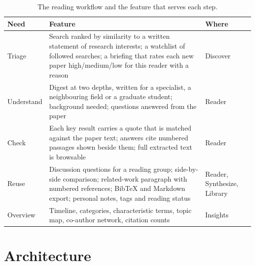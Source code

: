 \documentclass[11pt,a4paper]{article}
\begin{document}
\begin{table}[htbp]\centering\small
\begin{tabularx}{\linewidth}{@{}l>{\raggedright\arraybackslash}X>{\raggedright\arraybackslash}X@{}}
\toprule
Need & Feature & Where \\
\midrule
Triage & Search ranked by similarity to a written statement of research interests; a watchlist of followed
  searches; a briefing that rates each new paper high/medium/low for this reader with a reason &
  Discover \\
Understand & Digest at two depths, written for a specialist, a neighbouring field or a graduate student;
  background needed; questions answered from the paper & Reader \\
Check & Each key result carries a quote that is matched against the paper text; answers cite numbered
  passages shown beside them; full extracted text is browsable & Reader \\
Reuse & Discussion questions for a reading group; side-by-side comparison; related-work paragraph with
  numbered references; BibTeX and Markdown export; personal notes, tags and reading status &
  Reader, Synthesize, Library \\
Overview & Timeline, categories, characteristic terms, topic map, co-author network, citation counts &
  Insights \\
\bottomrule
\end{tabularx}
\caption{The reading workflow and the feature that serves each step.}
\end{table}

\section{Architecture}
\end{document}
